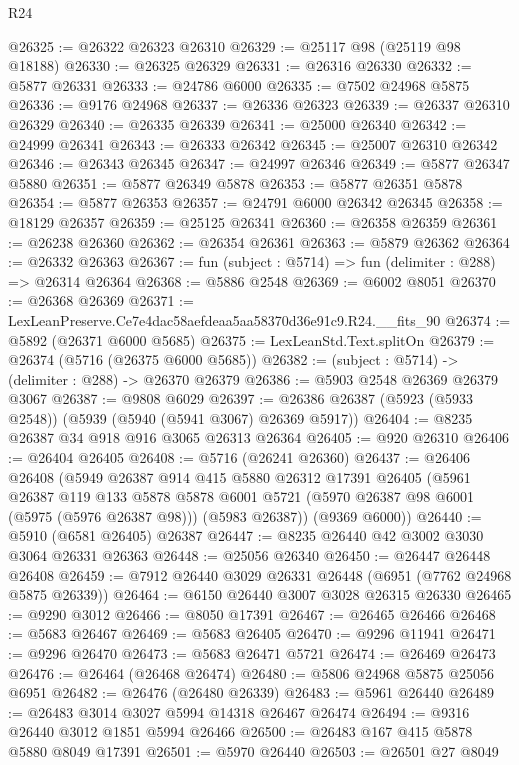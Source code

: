 \begin{lexlean}{R24}
\begin{coremodule}
@26325 := @26322 @26323 @26310
@26329 := @25117 @98 (@25119 @98 @18188)
@26330 := @26325 @26329
@26331 := @26316 @26330
@26332 := @5877 @26331
@26333 := @24786 @6000
@26335 := @7502 @24968 @5875
@26336 := @9176 @24968
@26337 := @26336 @26323
@26339 := @26337 @26310 @26329
@26340 := @26335 @26339
@26341 := @25000 @26340
@26342 := @24999 @26341
@26343 := @26333 @26342
@26345 := @25007 @26310 @26342
@26346 := @26343 @26345
@26347 := @24997 @26346
@26349 := @5877 @26347 @5880
@26351 := @5877 @26349 @5878
@26353 := @5877 @26351 @5878
@26354 := @5877 @26353
@26357 := @24791 @6000 @26342 @26345
@26358 := @18129 @26357
@26359 := @25125 @26341
@26360 := @26358 @26359
@26361 := @26238 @26360
@26362 := @26354 @26361
@26363 := @5879 @26362
@26364 := @26332 @26363
@26367 := fun (subject : @5714) => fun (delimiter : @288) => @26314 @26364
@26368 := @5886 @2548
@26369 := @6002 @8051
@26370 := @26368 @26369
@26371 := LexLeanPreserve.Ce7e4dac58aefdeaa5aa58370d36e91c9.R24.__fits_90
@26374 := @5892 (@26371 @6000 @5685)
@26375 := LexLeanStd.Text.splitOn
@26379 := @26374 (@5716 (@26375 @6000 @5685))
@26382 := (subject : @5714) -> (delimiter : @288) -> @26370 @26379
@26386 := @5903 @2548 @26369 @26379 @3067
@26387 := @9808 @6029
@26397 := @26386 @26387 (@5923 (@5933 @2548)) (@5939 (@5940 (@5941 @3067) @26369 @5917))
@26404 := @8235 @26387 @34 @918 @916 @3065 @26313 @26364
@26405 := @920 @26310
@26406 := @26404 @26405
@26408 := @5716 (@26241 @26360)
@26437 := @26406
    @26408
    (@5949
      @26387
      @914
      @415
      @5880
      @26312
      @17391
      @26405
      (@5961
        @26387
        @119
        @133
        @5878
        @5878
        @6001
        @5721
        (@5970 @26387 @98 @6001 (@5975 (@5976 @26387 @98)))
        (@5983 @26387))
      (@9369 @6000))
@26440 := @5910 (@6581 @26405) @26387
@26447 := @8235 @26440 @42 @3002 @3030 @3064 @26331 @26363
@26448 := @25056 @26340
@26450 := @26447 @26448 @26408
@26459 := @7912 @26440 @3029 @26331 @26448 (@6951 (@7762 @24968 @5875 @26339))
@26464 := @6150 @26440 @3007 @3028 @26315 @26330
@26465 := @9290 @3012
@26466 := @8050 @17391
@26467 := @26465 @26466
@26468 := @5683 @26467
@26469 := @5683 @26405
@26470 := @9296 @11941
@26471 := @9296 @26470
@26473 := @5683 @26471 @5721
@26474 := @26469 @26473
@26476 := @26464 (@26468 @26474)
@26480 := @5806 @24968 @5875 @25056 @6951
@26482 := @26476 (@26480 @26339)
@26483 := @5961 @26440
@26489 := @26483 @3014 @3027 @5994 @14318 @26467 @26474
@26494 := @9316 @26440 @3012 @1851 @5994 @26466
@26500 := @26483 @167 @415 @5878 @5880 @8049 @17391
@26501 := @5970 @26440
@26503 := @26501 @27 @8049

\end{coremodule}
\end{lexlean}
